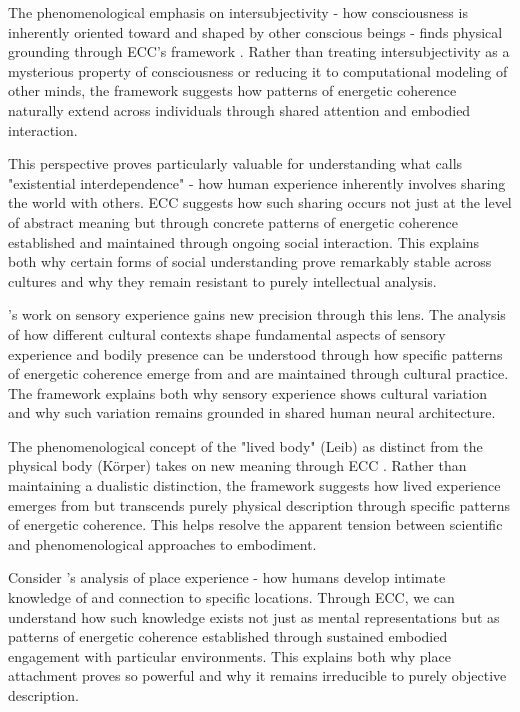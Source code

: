 The phenomenological emphasis on intersubjectivity - how consciousness is inherently oriented toward and shaped by other conscious beings - finds physical grounding through ECC's framework \cite{jackson1996things}. Rather than treating intersubjectivity as a mysterious property of consciousness or reducing it to computational modeling of other minds, the framework suggests how patterns of energetic coherence naturally extend across individuals through shared attention and embodied interaction.

This perspective proves particularly valuable for understanding what \cite{jackson1996things} calls "existential interdependence" - how human experience inherently involves sharing the world with others. ECC suggests how such sharing occurs not just at the level of abstract meaning but through concrete patterns of energetic coherence established and maintained through ongoing social interaction. This explains both why certain forms of social understanding prove remarkably stable across cultures and why they remain resistant to purely intellectual analysis.

\cite{desjarlais1992body}'s work on sensory experience gains new precision through this lens. The analysis of how different cultural contexts shape fundamental aspects of sensory experience and bodily presence can be understood through how specific patterns of energetic coherence emerge from and are maintained through cultural practice. The framework explains both why sensory experience shows cultural variation and why such variation remains grounded in shared human neural architecture.

The phenomenological concept of the "lived body" (Leib) as distinct from the physical body (Körper) takes on new meaning through ECC \cite{varela1991embodied}. Rather than maintaining a dualistic distinction, the framework suggests how lived experience emerges from but transcends purely physical description through specific patterns of energetic coherence. This helps resolve the apparent tension between scientific and phenomenological approaches to embodiment.

Consider \cite{casey1996space}'s analysis of place experience - how humans develop intimate knowledge of and connection to specific locations. Through ECC, we can understand how such knowledge exists not just as mental representations but as patterns of energetic coherence established through sustained embodied engagement with particular environments. This explains both why place attachment proves so powerful and why it remains irreducible to purely objective description.

